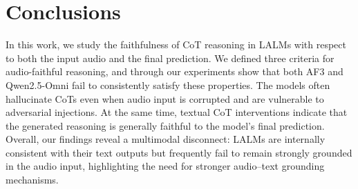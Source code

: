 \documentclass{Interspeech}
\begin{document}

\vspace{-.4cm}
\section{Conclusions}
In this work, we study the faithfulness of CoT reasoning in LALMs with respect to both the input audio and the final prediction. We defined three criteria for audio-faithful reasoning, and through our experiments show that both AF3 and Qwen2.5-Omni fail to consistently satisfy these properties. The models often hallucinate CoTs even when audio input is corrupted and are vulnerable to adversarial injections. 
At the same time, textual CoT interventions indicate that the generated reasoning is generally faithful to the model’s final prediction. Overall, our findings reveal a multimodal disconnect: LALMs are internally consistent with their text outputs but frequently fail to remain strongly grounded in the audio input, highlighting the need for stronger audio–text grounding mechanisms.
\end{document}
